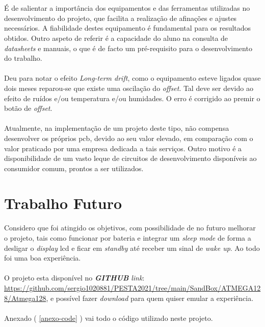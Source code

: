 \\
\\
É de salientar a importância dos equipamentos e das ferramentas utilizadas no desenvolvimento do projeto, que facilita a realização de afinações e ajustes necessários. A fiabilidade destes equipamento é fundamental para os resultados obtidos.
Outro aspeto de referir é a capacidade do aluno na consulta de \textit{datasheets} e manuais, o que é de facto um pré-requisito para o desenvolvimento do trabalho.
\\
\\
Deu para notar o efeito \textit{Long-term drift}, como o equipamento esteve ligados quase dois meses reparou-se que existe uma oscilação do \textit{offset}. Tal deve ser devido ao efeito de ruídos e/ou temperatura e/ou humidades. O erro é corrigido ao premir o botão de \textit{offset}.
\\
\\
Atualmente, na implementação de um projeto deste tipo, não compensa desenvolver os próprios \acs{pcb}, devido ao seu valor elevado, em comparação com o valor praticado por uma empresa dedicada a tais serviços. Outro motivo é a disponibilidade  de um vasto leque de circuitos de desenvolvimento disponíveis ao consumidor comum, prontos a ser utilizados.
\newpage
\section{Trabalho Futuro}
Considero que foi atingido os objetivos, com possibilidade de no futuro melhorar o projeto, tais como funcionar por bateria e integrar um \textit{sleep mode} de forma a desligar o \textit{display} \acs{lcd} e ficar em \textit{standby} até receber um sinal de \textit{wake up}. Ao todo foi uma boa experiência.
\\
\\
O projeto esta disponível no \textit{\textbf{GITHUB}} \textit{link}: \url{https://github.com/sergio1020881/PESTA2021/tree/main/SandBox/ATMEGA128/Atmega128}, e possível fazer \textit{download} para quem quiser emular a experiência.
\\
\\
Anexado ( \ref{anexo-code} ) vai todo o código utilizado neste projeto.
\begin{comment}
Sensitivity,Long-Term Drift e Temperature Effects (Span temperature hysteresis).
\end{comment}
